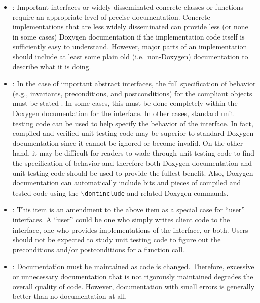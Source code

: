 \begin{itemize}


\item\DOXPVariableLevelOfDetail: Important interfaces or widely
  disseminated concrete classes or functions require an appropriate
  level of precise documentation.  Concrete implementations that are
  less widely disseminated can provide less (or none in some cases)
  Doxygen documentation if the implementation code itself is
  sufficiently easy to understand.  However, major parts of an
  implementation should include at least some plain old (i.e.\
  non-Doxygen) documentation to describe what it is doing.

\item\DOXPFullyDocumentInterfaces: In the case of important abstract
  interfaces, the full specification of behavior (e.g., invariants,
  preconditions, and postconditions) for the compliant objects must be
  stated \cite[Item 69]{C++CodingStandards05}.  In some cases, this
  must be done completely within the Doxygen documentation for the
  interface.  In other cases, standard unit testing code can be used
  to help specify the behavior of the interface.  In fact, compiled
  and verified unit testing code may be superior to standard Doxygen
  documentation since it cannot be ignored or become invalid.  On the
  other hand, it may be difficult for readers to wade through unit
  testing code to find the specification of behavior and therefore
  both Doxygen documentation and unit testing code should be used to
  provide the fullest benefit.  Also, Doxygen documentation can
  automatically include bits and pieces of compiled and tested code
  using the \texttt{$\backslash$dontinclude} and related Doxygen
  commands.

\item\DOXPFullyDocumentUserIntefaces: This item is an amendment to the
  above item as a special case for ``user'' interfaces.  A ``user''
  could be one who simply writes client code to the interface, one who
  provides implementations of the interface, or both.  Users should
  not be expected to study unit testing code to figure out the
  preconditions and/or postconditions for a function call.

\item\DOXPWrongDocumentationBad: Documentation must be maintained as
  code is changed.  Therefore, excessive or unnecessary documentation
  that is not rigorously maintained degrades the overall quality of
  code.  However, documentation with small errors is generally better
  than no documentation at all.


\end{itemize}
